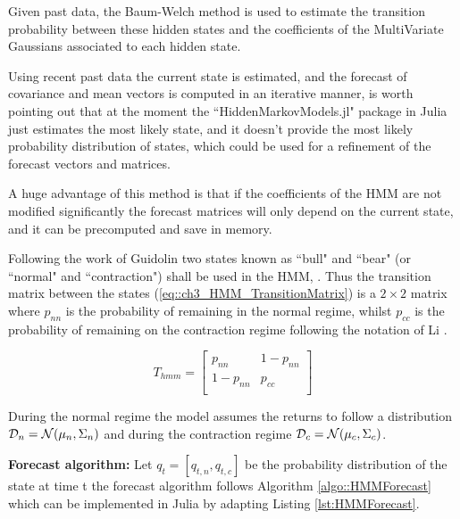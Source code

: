 Given past data, the Baum-Welch method \cite{OG_BaumWelch} is used to estimate the transition probability between these hidden states and the coefficients of the MultiVariate Gaussians associated to each hidden state.

Using recent past data the current state is estimated, and the forecast of covariance and mean vectors is computed in an iterative manner, is worth pointing out that at the moment the ``HiddenMarkovModels.jl" package \cite{HiddenMarkovModels.jl} in Julia just estimates the most likely state, and it doesn't provide the most likely probability distribution of states, which could be used for a refinement of the forecast vectors and matrices.

A huge advantage of this method is that if the coefficients of the HMM are not modified significantly the forecast matrices will only depend on the current state, and it can be precomputed and save in memory.

Following the work of Guidolin \cite{numberOfRegimes} two states known as ``bull" and ``bear" (or ``normal" and ``contraction") shall be used in the \ac{HMM}, . Thus the transition matrix between the states (\ref{eq::ch3_HMM_TransitionMatrix}) is a $2\times2$ matrix where $p_{nn}$ is the probability of remaining in the normal regime, whilst $p_{cc}$ is the probability of remaining on the contraction regime following the notation of Li \cite{MultiPeriod_PO_mpc}.

\begin{equation} \label{eq::ch3_HMM_TransitionMatrix}
    T_{hmm}=\begin{bmatrix}
        p_{nn} & 1- p_{nn} \\
        1-p_{nn} & p_{cc} \\
    \end{bmatrix}
\end{equation}

During the normal regime the model assumes the returns to follow a distribution $\mathcal{D}_n=\mathcal{N}(\mu_{n},\Sigma_{n})$ and during the contraction regime $\mathcal{D}_c=\mathcal{N}(\mu_{c},\Sigma_{c})$. 

\textbf{Forecast algorithm:} Let $q_t=[q_{t,n},q_{t,c}]$ be the probability distribution of the state at time t the forecast algorithm follows Algorithm \ref{algo::HMMForecast} which can be implemented in Julia by adapting Listing \ref{lst:HMMForecast}.

